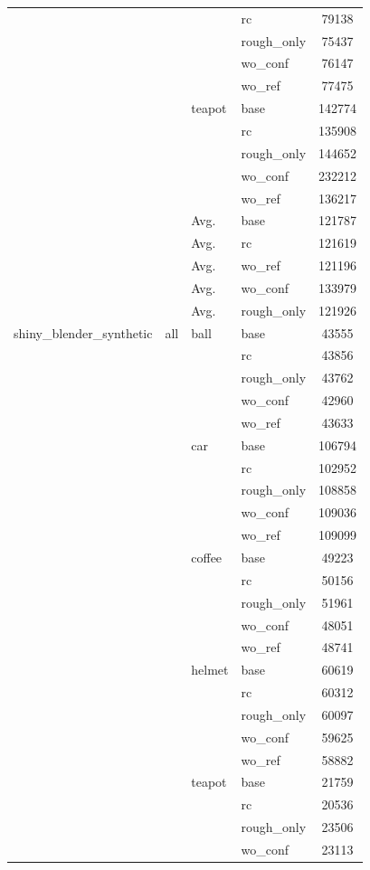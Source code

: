 \begin{table}[t]
{\begin{tabular}{llllc}
 &  &  & rc & 79138 \\
 &  &  & rough\_only & 75437 \\
 &  &  & wo\_conf & 76147 \\
 &  &  & wo\_ref & 77475 \\
 &  & teapot & base & 142774 \\
 &  &  & rc & 135908 \\
 &  &  & rough\_only & 144652 \\
 &  &  & wo\_conf & 232212 \\
 &  &  & wo\_ref & 136217 \\
 & & Avg. & base & 121787 \\
 & & Avg. & rc & 121619 \\
 & & Avg. & wo\_ref & 121196 \\
 & & Avg. & wo\_conf & 133979 \\
 & & Avg. & rough\_only & 121926 \\
\midrule
shiny\_blender\_synthetic & all & ball & base & 43555 \\
 &  &  & rc & 43856 \\
 &  &  & rough\_only & 43762 \\
 &  &  & wo\_conf & 42960 \\
 &  &  & wo\_ref & 43633 \\
 &  & car & base & 106794 \\
 &  &  & rc & 102952 \\
 &  &  & rough\_only & 108858 \\
 &  &  & wo\_conf & 109036 \\
 &  &  & wo\_ref & 109099 \\
 &  & coffee & base & 49223 \\
 &  &  & rc & 50156 \\
 &  &  & rough\_only & 51961 \\
 &  &  & wo\_conf & 48051 \\
 &  &  & wo\_ref & 48741 \\
 &  & helmet & base & 60619 \\
 &  &  & rc & 60312 \\
 &  &  & rough\_only & 60097 \\
 &  &  & wo\_conf & 59625 \\
 &  &  & wo\_ref & 58882 \\
 &  & teapot & base & 21759 \\
 &  &  & rc & 20536 \\
 &  &  & rough\_only & 23506 \\
 &  &  & wo\_conf & 23113 \\

\end{tabular}}
\end{table}
